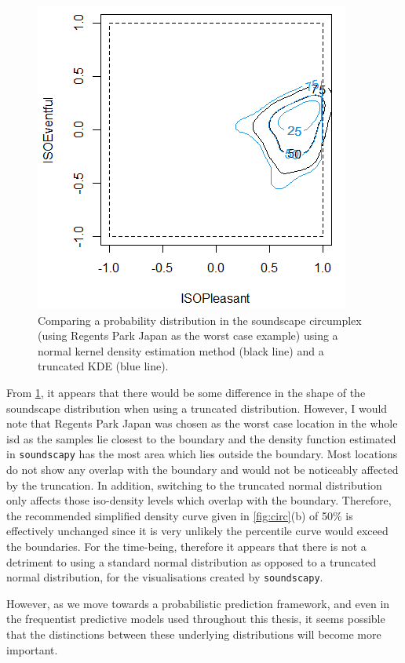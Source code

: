 \begin{figure}[h]
  \centering
  \includegraphics{Figures/Trunc-Normal-demo.png}
  \caption{Comparing a probability distribution in the soundscape circumplex (using Regents Park Japan as the worst case example) using a normal kernel density estimation method (black line) and a truncated KDE (blue line). \label{fig:truncatekde}}
\end{figure}

From \cref{fig:truncatekde}, it appears that there would be some difference in the shape of the soundscape distribution when using a truncated distribution. However, I would note that Regents Park Japan was chosen as the worst case location in the whole \gls{isd} as the samples lie closest to the boundary and the density function estimated in \texttt{soundscapy} has the most area which lies outside the boundary. Most locations do not show any overlap with the boundary and would not be noticeably affected by the truncation. In addition, switching to the truncated normal distribution only affects those iso-density levels which overlap with the boundary. Therefore, the recommended simplified density curve given in \cref{fig:circ}(b) of 50\% is effectively unchanged since it is very unlikely the  percentile curve would exceed the boundaries. For the time-being, therefore it appears that there is not a detriment to using a standard normal distribution as opposed to a truncated normal distribution, for the visualisations created by \texttt{soundscapy}.

However, as we move towards a probabilistic prediction framework, and even in the frequentist predictive models used throughout this thesis, it seems possible that the distinctions between these underlying distributions will become more important.

